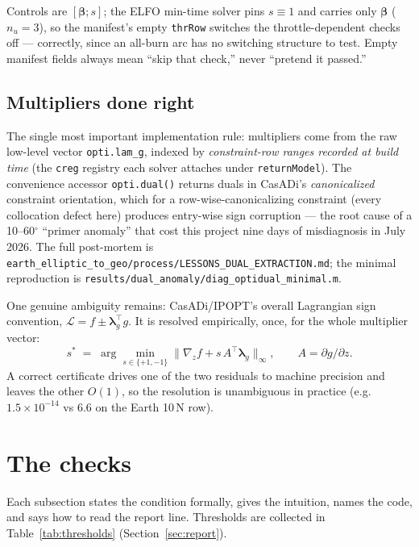 \documentclass[11pt]{article}
\newcommand{\vlam}{\boldsymbol{\lambda}}
\newcommand{\vbeta}{\boldsymbol{\beta}}
\newcommand{\Lag}{\mathcal{L}}
\newcommand{\file}[1]{\texttt{#1}}
\newcommand{\code}[1]{\texttt{#1}}
\begin{document}
\noindent
Controls are $[\vbeta;s]$; the ELFO min-time solver pins $s\equiv1$ and carries
only $\vbeta$ ($n_u=3$), so the manifest's empty \code{thrRow} switches the
throttle-dependent checks off --- correctly, since an all-burn arc has no
switching structure to test. Empty manifest fields always mean ``skip that
check,'' never ``pretend it passed.''

\subsection{Multipliers done right}
\label{sec:duals}

The single most important implementation rule: multipliers come from the raw
low-level vector \code{opti.lam\_g}, indexed by \emph{constraint-row ranges
recorded at build time} (the \code{creg} registry each solver attaches under
\code{returnModel}). The convenience accessor \code{opti.dual()} returns duals
in CasADi's \emph{canonicalized} constraint orientation, which for a
row-wise-canonicalizing constraint (every collocation defect here) produces
entry-wise sign corruption --- the root cause of a 10--60$^\circ$ ``primer
anomaly'' that cost this project nine days of misdiagnosis in July 2026. The
full post-mortem is
\file{earth\_elliptic\_to\_geo/process/LESSONS\_DUAL\_EXTRACTION.md}; the
minimal reproduction is
\file{results/dual\_anomaly/diag\_optidual\_minimal.m}.

One genuine ambiguity remains: CasADi/IPOPT's overall Lagrangian sign
convention, $\Lag = f \pm \vlam_g^{\!\top} g$. It is resolved empirically,
once, for the whole multiplier vector:
\begin{equation}
s^\ast \;=\; \arg\min_{s\in\{+1,-1\}}
\bigl\| \nabla_z f + s\,A^{\!\top}\vlam_g \bigr\|_\infty,
\qquad A = \partial g/\partial z .
\label{eq:signres}
\end{equation}
A correct certificate drives one of the two residuals to machine precision and
leaves the other $O(1)$, so the resolution is unambiguous in practice
(e.g.\ $1.5\times10^{-14}$ vs $6.6$ on the Earth 10\,N row).

\section{The checks}
\label{sec:checks}

Each subsection states the condition formally, gives the intuition, names the
code, and says how to read the report line. Thresholds are collected in
Table~\ref{tab:thresholds} (Section~\ref{sec:report}).
\end{document}
